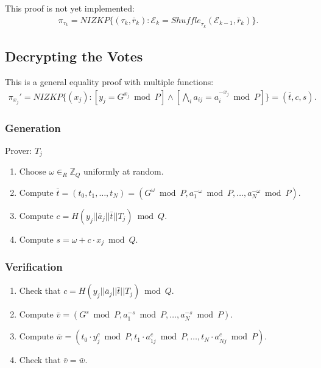 \documentclass[bibtotoc,halfparskip,oneside]{scrreprt}
\newcommand{\Tallier}[1]{\ensuremath{\mathit{T}_{#1}}\xspace}
\begin{document}
This proof is not yet implemented:
\begin{align*}
\pi_{\tau_k}=\mathit{NIZKP}\{(\tau_k,\bar{r}_k):\mathcal{E}_{k}=\mathit{Shuffle}_{\tau_k}(\mathcal{E}_{k-1},\bar{r}_k)\}.
\end{align*}

\subsection{Decrypting the Votes}\label{proof_decryption}

This is a general equality proof with multiple functions:
\begin{align*}
\pi_{x_j}'=\mathit{NIZKP}\{(x_j):[y_j=G^{x_j}\bmod{P}] \wedge \left[\bigwedge_i a_{ij} = a_i^{-x_j}\bmod{P}\right]\}=(\bar{t},c,s).
\end{align*}

\subsubsection{Generation}
Prover: $\Tallier{j}$
\begin{enumerate}	
	\item Choose $\omega\in_R\mathbb{Z}_Q$ uniformly at random.
	\item Compute $\bar{t}=(t_{0},t_{1},\ldots,t_{N})=(G^{\omega}\bmod{P},a_1^{-\omega}\bmod{P},\ldots,a_N^{-\omega}\bmod{P})$.
	\item Compute $c=H(y_j||\bar{a}_j||\bar{t}||\Tallier{j})\bmod{Q}$.
	\item Compute $s=\omega + c\cdot x_j\bmod{Q}$.
\end{enumerate}

\subsubsection{Verification}
\begin{enumerate}
	\item Check that $c=H(y_j||\bar{a}_j||\bar{t}||\Tallier{j})\bmod{Q}$.
	\item Compute $\bar{v}=(G^{s}\bmod{P},a_1^{-s}\bmod{P},\ldots,a_N^{-s}\bmod{P})$.
	\item Compute $\bar{w}=(t_{0}\cdot y_j^{c}\bmod{P},t_{1}\cdot a_{1j}^{c}\bmod{P},\ldots,t_{N}\cdot a_{Nj}^{c}\bmod{P})$.
	\item Check that $\bar{v}=\bar{w}$.
\end{enumerate}	
\end{document}
